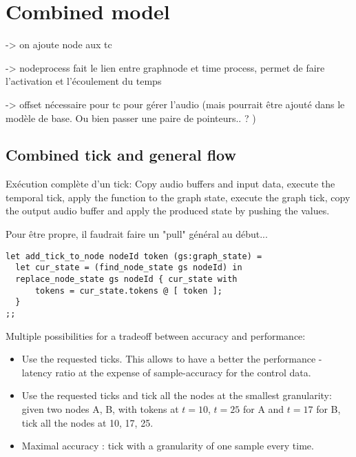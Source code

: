 \documentclass[applsci,article,submit,moreauthors,pdftex,10pt,a4paper]{mdpi}
\begin{document}
\section{Combined model}
-> on ajoute node aux tc

-> nodeprocess fait le lien entre graphnode et time process, permet de faire l'activation et l'écoulement du temps

-> offset nécessaire pour tc pour gérer l'audio (mais pourrait être ajouté dans le modèle de base. Ou bien passer une paire de pointeurs.. ? )

\subsection{Combined tick and general flow}
Exécution complète d'un tick: 
Copy audio buffers and input data, execute the temporal tick, apply the function to the graph state, execute the graph tick, copy the output audio buffer and apply the produced state by pushing the values.


Pour être propre, il faudrait faire un "pull" général au début...

\begin{lstlisting}
let add_tick_to_node nodeId token (gs:graph_state) =
  let cur_state = (find_node_state gs nodeId) in
  replace_node_state gs nodeId { cur_state with
      tokens = cur_state.tokens @ [ token ];
  }
;;
\end{lstlisting}

Multiple possibilities for a tradeoff between accuracy and performance: 
\begin{itemize}
	\item Use the requested ticks. This allows to have a better the performance - latency ratio at the expense of sample-accuracy for the control data.
	\item Use the requested ticks and tick all the nodes at the smallest granularity: 
	given two nodes A, B, with tokens at $t=10$, $t=25$ for A and $t=17$ for B, tick all the nodes at 10, 17, 25.
	\item Maximal accuracy : tick with a granularity of one sample every time.
\end{itemize}
\end{document}
